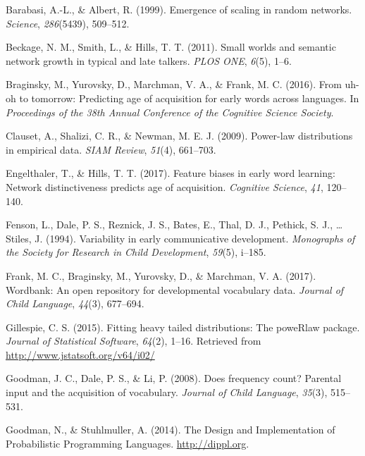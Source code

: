 \documentclass[english,floatsintext,man]{apa6}
\theoremstyle{definition}
\theoremstyle{definition}
\theoremstyle{definition}
\theoremstyle{remark}
\begin{document}
\setlength{\parindent}{-0.5in} \setlength{\leftskip}{0.5in}

\hypertarget{refs}{}
\hypertarget{ref-barabasi99}{}
Barabasi, A.-L., \& Albert, R. (1999). Emergence of scaling in random
networks. \emph{Science}, \emph{286}(5439), 509--512.

\hypertarget{ref-beckage2011}{}
Beckage, N. M., Smith, L., \& Hills, T. T. (2011). Small worlds and
semantic network growth in typical and late talkers. \emph{PLOS ONE},
\emph{6}(5), 1--6.

\hypertarget{ref-braginsky2016}{}
Braginsky, M., Yurovsky, D., Marchman, V. A., \& Frank, M. C. (2016).
From uh-oh to tomorrow: Predicting age of acquisition for early words
across languages. In \emph{Proceedings of the 38th Annual Conference of
the Cognitive Science Society}.

\hypertarget{ref-clauset09}{}
Clauset, A., Shalizi, C. R., \& Newman, M. E. J. (2009). Power-law
distributions in empirical data. \emph{SIAM Review}, \emph{51}(4),
661--703.

\hypertarget{ref-engelthaler2017}{}
Engelthaler, T., \& Hills, T. T. (2017). Feature biases in early word
learning: Network distinctiveness predicts age of acquisition.
\emph{Cognitive Science}, \emph{41}, 120--140.

\hypertarget{ref-fenson94}{}
Fenson, L., Dale, P. S., Reznick, J. S., Bates, E., Thal, D. J.,
Pethick, S. J., \ldots{} Stiles, J. (1994). Variability in early
communicative development. \emph{Monographs of the Society for Research
in Child Development}, \emph{59}(5), i--185.

\hypertarget{ref-frank2017}{}
Frank, M. C., Braginsky, M., Yurovsky, D., \& Marchman, V. A. (2017).
Wordbank: An open repository for developmental vocabulary data.
\emph{Journal of Child Language}, \emph{44}(3), 677--694.

\hypertarget{ref-gillespie15}{}
Gillespie, C. S. (2015). Fitting heavy tailed distributions: The
poweRlaw package. \emph{Journal of Statistical Software}, \emph{64}(2),
1--16. Retrieved from \url{http://www.jstatsoft.org/v64/i02/}

\hypertarget{ref-goodman2008}{}
Goodman, J. C., Dale, P. S., \& Li, P. (2008). Does frequency count?
Parental input and the acquisition of vocabulary. \emph{Journal of Child
Language}, \emph{35}(3), 515--531.

\hypertarget{ref-dippl}{}
Goodman, N., \& Stuhlmuller, A. (2014). The Design and Implementation of
Probabilistic Programming Languages. \url{http://dippl.org}.
\end{document}
